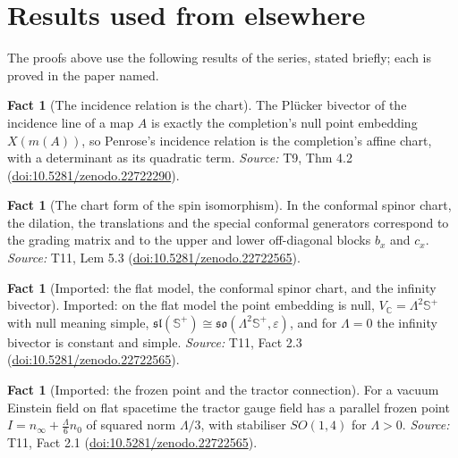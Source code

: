 \documentclass[11pt]{article}
\theoremstyle{definition}
\newtheorem{fact}[theorem]{Fact}
\theoremstyle{plain}
\providecommand{\C}{}\renewcommand{\C}{\mathbb{C}}
\providecommand{\CS}{}\renewcommand{\CS}{{\mathbb{S}^{+}}}
\providecommand{\nInf}{}\renewcommand{\nInf}{n_\infty}
\providecommand{\nO}{}\renewcommand{\nO}{n_0}
\providecommand{\so}{}\renewcommand{\so}{\mathfrak{so}}
\begin{document}
\section{Results used from elsewhere}
The proofs above use the following results of the series, stated briefly; each is proved in the paper named.

\begin{fact}[The incidence relation is the chart]\label{c:correspondence.incidence-relation-chart}
The Pl\"ucker bivector of the incidence line of a map $A$ is exactly the completion's null point embedding $X(m(A))$, so Penrose's incidence relation is the completion's affine chart, with a determinant as its quadratic term.
\emph{Source:} T9, Thm 4.2 (\href{https://doi.org/10.5281/zenodo.22722290}{doi:10.5281/zenodo.22722290}).
\end{fact}

\begin{fact}[The chart form of the spin isomorphism]\label{c:mass.chart-form-spin-isomorphism}
In the conformal spinor chart, the dilation, the translations and the special conformal generators correspond to the grading matrix and to the upper and lower off-diagonal blocks $b_x$ and $c_x$.
\emph{Source:} T11, Lem 5.3 (\href{https://doi.org/10.5281/zenodo.22722565}{doi:10.5281/zenodo.22722565}).
\end{fact}

\begin{fact}[Imported: the flat model, the conformal spinor chart, and the infinity bivector]\label{c:mass.imported-flat-model-twistor-chart-infinity}
Imported: on the flat model the point embedding is null, $V_\C = \Lambda^2\CS$ with null meaning simple, $\mathfrak{sl}(\CS) \cong \so(\Lambda^2\CS, \varepsilon)$, and for $\Lambda = 0$ the infinity bivector is constant and simple.
\emph{Source:} T11, Fact 2.3 (\href{https://doi.org/10.5281/zenodo.22722565}{doi:10.5281/zenodo.22722565}).
\end{fact}

\begin{fact}[Imported: the frozen point and the tractor connection]\label{c:mass.imported-frozen-point-tractor-connection}
For a vacuum Einstein field on flat spacetime the tractor gauge field has a parallel frozen point $I = \nInf + \tfrac{\Lambda}{6}\nO$ of squared norm $\Lambda/3$, with stabiliser $SO(1,4)$ for $\Lambda > 0$.
\emph{Source:} T11, Fact 2.1 (\href{https://doi.org/10.5281/zenodo.22722565}{doi:10.5281/zenodo.22722565}).
\end{fact}
\end{document}
